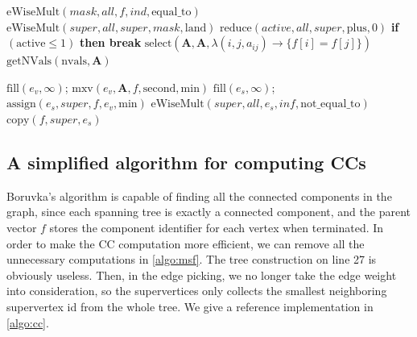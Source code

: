 \documentclass{sokendai_thesis} %
\newcommand{\boruvka}[0]{Boruvka}
\begin{document}
\begin{algorithm}[t]
\begin{algorithmic}[1]
    \State $\text{eWiseMult} (\mathit{mask}, \mathit{all}, \mathit{f}, \mathit{ind}, \text{equal\_to})$
    \State $\text{eWiseMult} (\mathit{super}, \mathit{all}, \mathit{super}, \mathit{mask}, \text{land})$
    \State $\text{reduce}(\mathit{active}, \mathit{all},\mathit{super}, \text{plus}, 0)$
    \State \textbf{if} $(\text{active}\leq 1)$ \textbf{then break}
    \State $\text{select} (\mathbf{A}, \mathbf{A}, \lambda(i,j,a_{ij})\rightarrow \{f[i]=f[j]\})$
    \State $\text{getNVals} (\text{nvals}, \mathbf{A})$
\State {}
\EndProcedure
\end{algorithmic}
\end{algorithm}

\begin{algorithm}[t]
\caption{The simplified edge picking operation in \boruvka{}'s algorithm for finding connected components.}
\label{algo:cc}
\begin{algorithmic}[1]
    \State {}
    \State $\text{fill} (\mathit{e_v}, \infty)$; $\text{mxv} (\mathit{e_v}, \mathbf{A}, \mathit{f}, \text{second}, \text{min})$
    \State $\text{fill} (\mathit{e_s}, \infty)$; $\text{assign} (\mathit{e_s}, \mathit{super}, \mathit{f}, \mathit{e_v}, \text{min})$
    \State $\text{eWiseMult} (\mathit{super}, \mathit{all}, \mathit{e_s}, \mathit{inf}, \text{not\_equal\_to})$
    \State $\text{copy} (\mathit{f}, \mathit{super}, \mathit{e_s})$
\EndProcedure
\end{algorithmic}
\end{algorithm}

\subsection{A simplified algorithm for computing CCs}

\boruvka{}'s algorithm is capable of finding all the connected components in the graph, since each spanning tree is exactly a connected component, and the parent vector $f$ stores the component identifier for each vertex when terminated.
In order to make the CC computation more efficient, we can remove all the unnecessary computations in \autoref{algo:msf}.
The tree construction on line 27 is obviously useless.
Then, in the edge picking, we no longer take the edge weight into consideration, so the supervertices only collects the smallest neighboring supervertex id from the whole tree.
We give a reference implementation in \autoref{algo:cc}.
\end{document}
